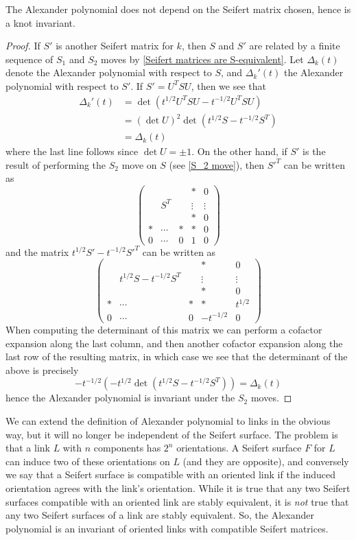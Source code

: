 \begin{prop}
\label{Alexander polynomial is a knot invariant}
The Alexander polynomial does not depend on the Seifert matrix chosen, hence is a knot invariant.
\end{prop}
\begin{proof}
If $S'$ is another Seifert matrix for $k$, then $S$ and $S'$ are related by a finite sequence of $S_1$ and $S_2$ moves by \cref{Seifert matrices are S-equivalent}. Let $\Delta_k(t)$ denote the Alexander polynomial with respect to $S$, and $\Delta_k'(t)$ the Alexander polynomial with respect to $S'$. If $S' = U^TSU$, then we see that
\begin{align*}
	\Delta_k'(t) &= \det \left( t^{1/2} U^TSU - t^{-1/2} U^TSU \right) \\
	             &= (\det U)^2 \det \left( t^{1/2} S - t^{-1/2} S^T \right) \\
	             &= \Delta_k(t)
\end{align*}
where the last line follows since $\det U = \pm 1$. On the other hand, if $S'$ is the result of performing the $S_2$ move on $S$ (see \eqref{S_2 move}), then $S'^T$ can be written as
\[ \begin{pmatrix}  & & & * & 0 \\ & S^T & & \vdots & \vdots \\ & & & * & 0 \\ * & \cdots & * & * & 0 \\ 0 & \cdots & 0 & 1 & 0 \end{pmatrix} \]
and the matrix $t^{1/2} S' - t^{-1/2} S'^T$ can be written as
\[ \begin{pmatrix}  & & & * & 0 \\ & t^{1/2} S - t^{-1/2} S^T & & \vdots & \vdots \\ & & & * & 0 \\ * & \cdots & * & * & t^{1/2} \\ 0 & \cdots & 0 & -t^{-1/2} & 0 \end{pmatrix} \]
When computing the determinant of this matrix we can perform a cofactor expansion along the last column, and then another cofactor expansion along the last row of the resulting matrix, in which case we see that the determinant of the above is precisely
\[ -t^{-1/2} \left( -t^{1/2} \det \left( t^{1/2} S - t^{-1/2} S^T \right) \right) = \Delta_k(t) \]
hence the Alexander polynomial is invariant under the $S_2$ moves. 
\end{proof}

We can extend the definition of Alexander polynomial to links in the obvious way, but it will no longer be independent of the Seifert surface. The problem is that a link $L$ with $n$ components has $2^n$ orientations. A Seifert surface $F$ for $L$ can induce two of these orientations on $L$ (and they are opposite), and conversely we say that a Seifert surface is compatible with an oriented link if the induced orientation agrees with the link's orientation. While it is true that any two Seifert surfaces compatible with an oriented link are stably equivalent, it is \emph{not} true that any two Seifert surfaces of a link are stably equivalent. So, the Alexander polynomial is an invariant of oriented links with compatible Seifert matrices.

